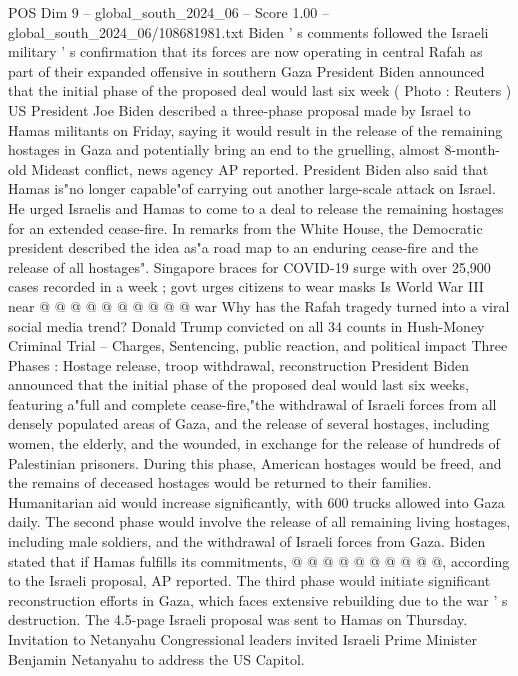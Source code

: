 \begin{textsample}{POS Dim 9 – global\_south\_2024\_06 – Score 1.00 – global\_south\_2024\_06/108681981.txt}  \label{ex:f9_pos_093}
Biden ' s comments followed the Israeli military ' s confirmation that its forces are now operating in central Rafah as part of their expanded offensive in southern Gaza President Biden announced that the initial phase of the proposed deal would last six week ( Photo : Reuters ) US President Joe Biden described a three-phase proposal made by Israel to Hamas militants on Friday, saying it would result in the release of the remaining hostages in Gaza and potentially bring an end to the gruelling, almost 8-month-old Mideast conflict, news agency AP reported.
President Biden also said that Hamas is"no longer capable"of carrying out another large-scale attack on Israel.
He urged Israelis and Hamas to come to a deal to release the remaining hostages for an extended cease-fire.
In remarks from the White House, the Democratic president described the idea as"a road map to an enduring cease-fire and the release of all hostages".
Singapore braces for COVID-19 surge with over 25,900 cases recorded in a week ; govt urges citizens to wear masks Is World War III near @ @ @ @ @ @ @ @ @ @ war Why has the Rafah tragedy turned into a viral social media trend?
Donald Trump convicted on all 34 counts in Hush-Money Criminal Trial -- Charges, Sentencing, public reaction, and political impact Three Phases : Hostage release, troop withdrawal, reconstruction President Biden announced that the initial phase of the proposed deal would last six weeks, featuring a"full and complete cease-fire,"the withdrawal of Israeli forces from all densely populated areas of Gaza, and the release of several hostages, including women, the elderly, and the wounded, in exchange for the release of hundreds of Palestinian prisoners.
During this phase, American hostages would be freed, and the remains of deceased hostages would be returned to their families.
Humanitarian aid would increase significantly, with 600 trucks allowed into Gaza daily.
The second phase would involve the release of all remaining living hostages, including male soldiers, and the withdrawal of Israeli forces from Gaza.
Biden stated that if Hamas fulfills its commitments, @ @ @ @ @ @ @ @ @ @, according to the Israeli proposal, AP reported.
The third phase would initiate significant reconstruction efforts in Gaza, which faces extensive rebuilding due to the war ' s destruction.
The 4.5-page Israeli proposal was sent to Hamas on Thursday.
Invitation to Netanyahu Congressional leaders invited Israeli Prime Minister Benjamin Netanyahu to address the US Capitol.

\end{textsample}
